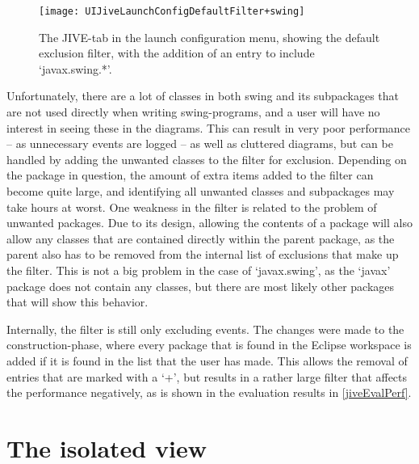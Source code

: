 \begin{figure}[H]
	\centering
	\texttt{[image: UIJiveLaunchConfigDefaultFilter+swing]}
	\caption[The JIVE-tab in the launch configuration menu.]{The JIVE-tab in the launch configuration menu, showing the default exclusion filter, with the addition of an entry to include `javax.swing.*'.}
	\label{fig:UIJiveLaunchConfigDefaultFilter+swing}
\end{figure}

Unfortunately, there are a lot of classes in both swing and its subpackages that are not used directly when writing swing-programs, and a user will have no interest in seeing these in the diagrams.
This can result in very poor performance -- as unnecessary events are logged -- as well as cluttered diagrams, but can be handled by adding the unwanted classes to the filter for exclusion.
Depending on the package in question, the amount of extra items added to the filter can become quite large, and identifying all unwanted classes and subpackages may take hours at worst.
One weakness in the filter is related to the problem of unwanted packages.
Due to its design, allowing the contents of a package will also allow any classes that are contained directly within the parent package, as the parent also has to be removed from the internal list of exclusions that make up the filter.
This is not a big problem in the case of `javax.swing', as the `javax' package does not contain any classes, but there are most likely other packages that will show this behavior.

Internally, the filter is still only excluding events.
The changes were made to the construction-phase, where every package that is found in the Eclipse workspace is added if it is found in the list that the user has made.
This allows the removal of entries that are marked with a `+', but results in a rather large filter that affects the performance negatively, as is shown in the evaluation results in \cref{jiveEvalPerf}.

\section{The isolated view}\label{isoView}


